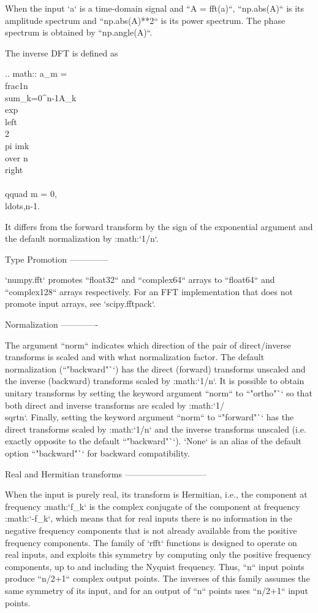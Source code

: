 \begin{DoxyVerb}
When the input `a` is a time-domain signal and ``A = fft(a)``, ``np.abs(A)``
is its amplitude spectrum and ``np.abs(A)**2`` is its power spectrum.
The phase spectrum is obtained by ``np.angle(A)``.

The inverse DFT is defined as

.. math::
   a_m = \\frac{1}{n}\\sum_{k=0}^{n-1}A_k\\exp\\left\\{2\\pi i{mk\\over n}\\right\\}
   \\qquad m = 0,\\ldots,n-1.

It differs from the forward transform by the sign of the exponential
argument and the default normalization by :math:`1/n`.

Type Promotion
--------------

`numpy.fft` promotes ``float32`` and ``complex64`` arrays to ``float64`` and
``complex128`` arrays respectively. For an FFT implementation that does not
promote input arrays, see `scipy.fftpack`.

Normalization
-------------

The argument ``norm`` indicates which direction of the pair of direct/inverse
transforms is scaled and with what normalization factor.
The default normalization (``"backward"``) has the direct (forward) transforms
unscaled and the inverse (backward) transforms scaled by :math:`1/n`. It is
possible to obtain unitary transforms by setting the keyword argument ``norm``
to ``"ortho"`` so that both direct and inverse transforms are scaled by
:math:`1/\\sqrt{n}`. Finally, setting the keyword argument ``norm`` to
``"forward"`` has the direct transforms scaled by :math:`1/n` and the inverse
transforms unscaled (i.e. exactly opposite to the default ``"backward"``).
`None` is an alias of the default option ``"backward"`` for backward
compatibility.

Real and Hermitian transforms
-----------------------------

When the input is purely real, its transform is Hermitian, i.e., the
component at frequency :math:`f_k` is the complex conjugate of the
component at frequency :math:`-f_k`, which means that for real
inputs there is no information in the negative frequency components that
is not already available from the positive frequency components.
The family of `rfft` functions is
designed to operate on real inputs, and exploits this symmetry by
computing only the positive frequency components, up to and including the
Nyquist frequency.  Thus, ``n`` input points produce ``n/2+1`` complex
output points.  The inverses of this family assumes the same symmetry of
its input, and for an output of ``n`` points uses ``n/2+1`` input points.


\end{DoxyVerb}
